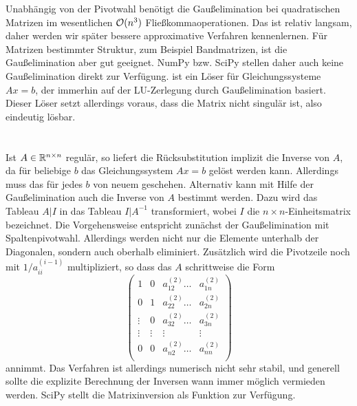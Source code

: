 Unabhängig von der Pivotwahl benötigt die Gaußelimination bei
quadratischen Matrizen im wesentlichen $\mathcal O(n^3)$
Fließkommaoperationen. Das ist relativ langsam, daher werden wir
später bessere approximative Verfahren kennenlernen. Für Matrizen
bestimmter Struktur, zum Beispiel Bandmatrizen, ist die
Gaußelimination aber gut geeignet. NumPy bzw. SciPy stellen daher auch
keine Gaußelimination direkt zur Verfügung.
 ist ein Löser für Gleichungssysteme
$Ax=b$, der immerhin auf der LU-Zerlegung durch Gaußelimination
basiert. Dieser Löser setzt allerdings voraus, dass die Matrix nicht
singulär ist, also eindeutig lösbar.
 
\section{}

Ist $A\in\mathbb{R}^{n\times n}$ regulär, so liefert die Rücksubstitution
implizit die Inverse von $A$, da für beliebige $b$ das
Gleichungssystem $Ax=b$ gelöst werden kann. Allerdings muss das für
jedes $b$ von neuem geschehen. Alternativ kann mit Hilfe der
Gaußelimination auch die Inverse von $A$ bestimmt werden. Dazu wird
das Tableau $A|I$ in das Tableau $I|A^{-1}$ transformiert, wobei $I$
die $n\times n$-Einheitsmatrix bezeichnet. Die Vorgehensweise
entspricht zunächst der Gaußelimination mit
Spaltenpivotwahl. Allerdings werden nicht nur die Elemente unterhalb
der Diagonalen, sondern auch oberhalb eliminiert. Zusätzlich wird die
Pivotzeile noch mit $1/a_{ii}^{(i-1)}$ multipliziert, so dass das $A$
schrittweise die Form
\begin{equation}
  \left(\begin{array}{cccc}
      1     & 0      & a_{12}^{(2)}\ldots &a_{1n}^{(2)} \\
      0     & 1      & a_{22}^{(2)}\ldots &a_{2n}^{(2)} \\
      \vdots& 0      & a_{32}^{(2)}\ldots &a_{3n}^{(2)} \\
      \vdots& \vdots & \vdots             & \vdots      \\
      0     & 0      & a_{n2}^{(2)}\ldots &a_{nn}^{(2)} \\
    \end{array}\right)
\end{equation}
annimmt. Das Verfahren ist allerdings numerisch nicht sehr stabil, und
generell sollte die explizite Berechnung der Inversen wann immer
möglich vermieden werden. SciPy stellt die Matrixinversion als
Funktion  zur Verfügung.

